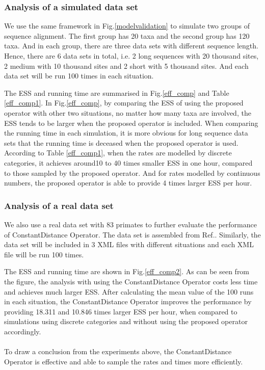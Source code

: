 \documentclass{bmcart}
\begin{document}
\subsubsection*{Analysis of a simulated data set}
We use the same framework in Fig.\ref{modelvalidation}  to simulate two groups of sequence alignment. The first group has 20 taxa and the second group has 120 taxa. And in each group, there are three data sets with different sequence length. Hence, there are 6 data sets in total, i.e. 2 long sequences with 20 thousand sites, 2 medium with 10 thousand sites and 2 short with 5 thousand sites. And each data set will be run 100 times in each situation. 

The ESS and running time are summarised in Fig.\ref{eff_comp} and Table \ref{eff_comp1}. In Fig.\ref{eff_comp}, by comparing the ESS of using the proposed operator with other two situations, no matter how many taxa are involved, the ESS tends to be larger when the proposed operator is included. When comparing the running time in each simulation, it is more obvious for long sequence data sets that the running time is deceased when the proposed operator is used. According to Table \ref{eff_comp1}, when the rates are modelled by discrete categories, it achieves around10 to 40 times smaller ESS in one hour, compared to those sampled by the proposed operator. And for rates modelled by continuous numbers, the proposed operator is able to provide 4 times larger ESS per hour. 
\subsubsection*{Analysis of a real data set}
We also use a real data set with 83 primates to further evaluate the performance of ConstantDistance Operator. The data set is assembled from Ref.\cite{finstermeier2013mitogenomic}. Similarly, the data set will be included in 3 XML files with different situations and each XML file will be run 100 times. 

The ESS and running time are shown in Fig.\ref{eff_comp2}. As can be seen from the figure, the analysis with using the ConstantDistance Operator costs less time and achieves much larger ESS. After calculating the mean value of the 100 runs in each situation, the ConstantDistance Operator improves the performance by providing 18.311 and 10.846 times larger ESS per hour, when compared to simulations using discrete categories and without using the proposed operator accordingly. 
\\
\\
To draw a conclusion from the experiments above, the ConstantDistance Operator is effective and able to sample the rates and times more efficiently. 
\end{document}
